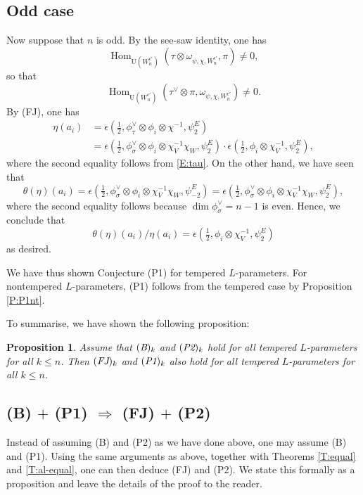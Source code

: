\documentclass[11pt]{amsart}
\numberwithin{equation}{section}
\theoremstyle{plain}
\newtheorem{prop}[thm]{Proposition}
\theoremstyle{definition}
\theoremstyle{remark}
\def\Hom{\operatorname{Hom}}
\def\U{\mathrm{U}}
\begin{document}
\subsection{Odd case}

Now suppose that $n$ is odd. By the see-saw identity, one has
 \[  \Hom_{\U(W_n^{\epsilon'})}(\tau \otimes \omega_{\psi,\chi, W_n^{\epsilon'}},  \pi) \ne  0, \]
so that
\[  \Hom_{\U(W_n^{\epsilon'})}(\tau^{\vee} \otimes \pi, \omega_{\psi, \chi, W_n^{\epsilon'}}) \ne 0. \]
By (FJ), one has
\begin{align*}
  \eta(a_i)  & = \epsilon(\tfrac{1}{2}, \phi_{\tau}^{\vee} \otimes \phi_i \otimes \chi^{-1},  \psi^E_2) \\
  & =  \epsilon(\tfrac{1}{2}, \phi_{\sigma}^{\vee} \otimes \phi_i \otimes \chi_V^{-1} \chi_W, \psi^E_2) \cdot \epsilon(\tfrac{1}{2}, \phi_i \otimes \chi_V^{-1}, \psi^E_2),
  \end{align*}
where the second equality follows from \eqref{E:tau}. On the other hand, we have seen that
  \[  
 \theta(\eta)(a_i)  =  \epsilon(\tfrac{1}{2}, \phi_{\sigma}^{\vee} \otimes \phi_i \otimes \chi_V^{-1} \chi_W, \psi^E_{-2}) =
  \epsilon(\tfrac{1}{2}, \phi_{\sigma}^{\vee} \otimes \phi_i \otimes \chi_V^{-1} \chi_W , \psi^E_2), \]
where the second equality follows because $\dim \phi_{\sigma}^{\vee}  = n-1$ is even. 
Hence, we conclude that
\[   \theta(\eta)(a_i) / \eta(a_i) = \epsilon(\tfrac{1}{2},  \phi_i \otimes \chi_V^{-1},  \psi^E_2) \]
as desired.

We have thus shown Conjecture (P1) for tempered $L$-parameters. For nontempered $L$-parameters, (P1) follows from the tempered case by Proposition \ref{P:P1nt}.

To summarise, we have shown the following proposition:

\begin{prop} \label{P:BP2-FJP1}
Assume that $(\emph{B})_k$ and $(\emph{P2})_k$ hold for all tempered $L$-parameters for all $k \le n$. Then $(\emph{FJ})_k$ and $(\emph{P1})_k$ also hold for all tempered $L$-parameters for all $k \le n$.
\end{prop}

\subsection{(B) $+$ (P1) $\Longrightarrow$ (FJ) $+$ (P2)}

Instead of assuming (B) and (P2) as we have done above, one may assume (B) and (P1). Using the same arguments as above, together with Theorems \ref{T:equal} and \ref{T:al-equal}, one can then deduce (FJ) and (P2). We state this formally as a proposition and leave the details of the proof to the reader.
\end{document}
